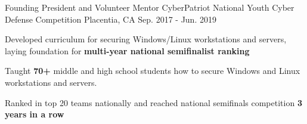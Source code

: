 \begin{cventries}
  \cventry
    {Founding President and Volunteer Mentor} %
    {CyberPatriot National Youth Cyber Defense Competition} %
    {Placentia, CA} %
    {Sep. 2017 - Jun. 2019} %
    {
      \begin{cvitems} %
        \item {Developed curriculum for securing Windows/Linux workstations and servers, laying foundation for \textbf{multi-year national semifinalist ranking}}
        \item {Taught \textbf{70+} middle and high school students how to secure Windows and Linux workstations and servers.}
        \item {Ranked in top 20 teams nationally and reached national semifinals competition \textbf{3 years in a row}}
      \end{cvitems}
    }

\end{cventries}
